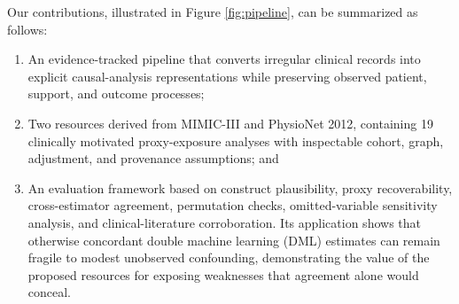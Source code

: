 \documentclass[letterpaper]{article}
\begin{document}

Our contributions, illustrated in Figure \ref{fig:pipeline}, can be summarized as follows:
\begin{enumerate}
    \item An evidence-tracked pipeline that converts irregular clinical records
    into explicit causal-analysis representations while preserving observed
    patient, support, and outcome processes;

    \item Two resources derived from MIMIC-III and PhysioNet 2012,
    containing 19 clinically motivated proxy-exposure analyses with inspectable
    cohort, graph, adjustment, and provenance assumptions; and
\item An evaluation framework based on construct plausibility, proxy
recoverability, cross-estimator agreement, permutation checks,
omitted-variable sensitivity analysis, and clinical-literature corroboration.
Its application shows that otherwise concordant double machine learning (DML)
estimates can remain fragile to modest unobserved confounding, demonstrating the value of the proposed resources for exposing weaknesses that agreement alone would conceal.
\end{enumerate}


\end{document}

